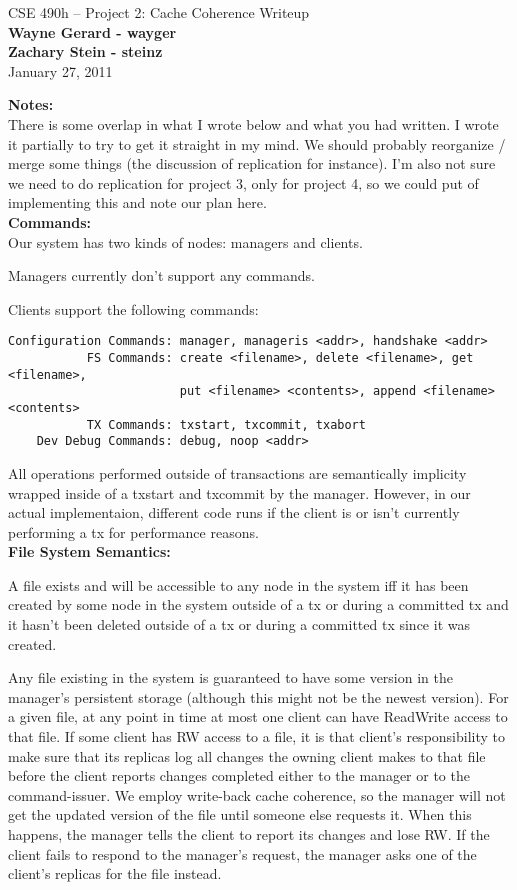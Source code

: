 \documentclass[11pt]{article}
\begin{document}
\begin{center}
{\large CSE 490h -- Project 2: Cache Coherence Writeup} \\
\textbf{Wayne Gerard - wayger} \\
\textbf{Zachary Stein - steinz} \\
January 27, 2011
\end{center}

\textbf{Notes:} \\

There is some overlap in what I wrote below and what you had written. I wrote it partially to try to get it straight in my mind. We should probably reorganize / merge some things (the discussion of replication for instance). I'm also not sure we need to do replication for project 3, only for project 4, so we could put of implementing this and note our plan here. \\

\textbf{Commands:} \\

Our system has two kinds of nodes: managers and clients.

Managers currently don't support any commands.

Clients support the following commands:
\begin{verbatim}
Configuration Commands: manager, manageris <addr>, handshake <addr>
           FS Commands: create <filename>, delete <filename>, get <filename>, 
                        put <filename> <contents>, append <filename> <contents>
           TX Commands: txstart, txcommit, txabort
    Dev Debug Commands: debug, noop <addr>
\end{verbatim}

All operations performed outside of transactions are semantically implicity wrapped inside of a txstart and txcommit by the manager.
However, in our actual implementaion, different code runs if the client is or isn't currently performing a tx for performance reasons. \\

\textbf{File System Semantics:}

A file exists and will be accessible to any node in the system iff it has been created by some node in the system outside of a tx or during a committed tx 
and it hasn't been deleted outside of a tx or during a committed tx since it was created.

Any file existing in the system is guaranteed to have some version in the manager's persistent storage (although this might not be the newest version).
For a given file, at any point in time at most one client can have ReadWrite access to that file.
If some client has RW access to a file, it is that client's responsibility to make sure that its replicas log all changes the owning client
makes to that file before the client reports changes completed either to the manager or to the command-issuer.
We employ write-back cache coherence, so the manager will not get the updated version of the file until someone else requests it.
When this happens, the manager tells the client to report its changes and lose RW.
If the client fails to respond to the manager's request, the manager asks one of the client's replicas for the file instead.
\end{document}
